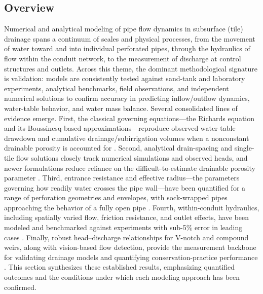 \subsection{Overview}

Numerical and analytical modeling of pipe flow dynamics in subsurface (tile) drainage
spans a continuum of scales and physical processes, from the movement of water toward
and into individual perforated pipes, through the hydraulics of flow within the conduit
network, to the measurement of discharge at control structures and outlets. Across this
theme, the dominant methodological signature is validation: models are consistently
tested against sand-tank and laboratory experiments, analytical benchmarks, field
observations, and independent numerical solutions to confirm accuracy in predicting
inflow/outflow dynamics, water-table behavior, and water mass balance. Several
consolidated lines of evidence emerge. First, the classical governing equations---the
Richards equation and its Boussinesq-based approximations---reproduce observed
water-table drawdown and cumulative drainage/subirrigation volumes when a nonconstant
drainable porosity is accounted for \parencite{TANG1977,Xin2016c}. Second, analytical
drain-spacing and single-tile flow solutions closely track numerical simulations and
observed heads, and newer formulations reduce reliance on the difficult-to-estimate
drainable porosity parameter \parencite{Cooke2001,KUMAR1994,SINGH1992,FathAllah2025,Chahar2010}.
Third, entrance resistance and effective radius---the parameters governing how readily
water crosses the pipe wall---have been quantified for a range of perforation geometries
and envelopes, with sock-wrapped pipes approaching the behavior of a fully open pipe
\parencite{Ghane2022,Ghane2022b,Gaj2020,Oyarce2017}. Fourth, within-conduit hydraulics,
including spatially varied flow, friction resistance, and outlet effects, have been
modeled and benchmarked against experiments with sub-5\% error in leading cases
\parencite{Bayat2011,Kouchakzadeh2011,Abdurrasheed2019,Graber2004,Nédélec2008}. Finally,
robust head--discharge relationships for V-notch and compound weirs, along with
vision-based flow detection, provide the measurement backbone for validating drainage
models and quantifying conservation-practice performance
\parencite{Christianson2019,BinShokrana2021,Katuwal2024,Napierala2023,Popek2021,Young2023}.
This section synthesizes these established results, emphasizing quantified outcomes and
the conditions under which each modeling approach has been confirmed.

